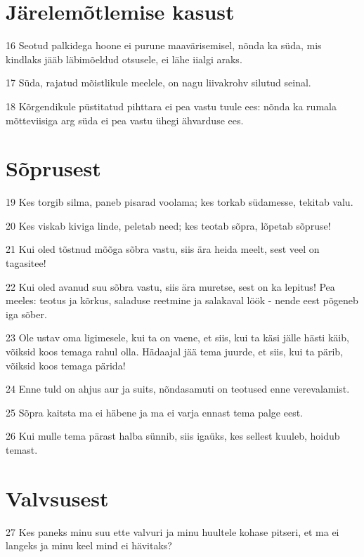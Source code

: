 \section*{Järelemõtlemise kasust}

\par 16 Seotud palkidega hoone ei purune maavärisemisel, nõnda ka süda, mis kindlaks jääb läbimõeldud otsusele, ei lähe iialgi araks.
\par 17 Süda, rajatud mõistlikule meelele, on nagu liivakrohv silutud seinal.
\par 18 Kõrgendikule püstitatud pihttara ei pea vastu tuule ees: nõnda ka rumala mõtteviisiga arg süda ei pea vastu ühegi ähvarduse ees.

\section*{Sõprusest}

\par 19 Kes torgib silma, paneb pisarad voolama; kes torkab südamesse, tekitab valu.
\par 20 Kes viskab kiviga linde, peletab need; kes teotab sõpra, lõpetab sõpruse!
\par 21 Kui oled tõstnud mõõga sõbra vastu, siis ära heida meelt, sest veel on tagasitee!
\par 22 Kui oled avanud suu sõbra vastu, siis ära muretse, sest on ka lepitus! Pea meeles: teotus ja kõrkus, saladuse reetmine ja salakaval löök - nende eest põgeneb iga sõber.
\par 23 Ole ustav oma ligimesele, kui ta on vaene, et siis, kui ta käsi jälle hästi käib, võiksid koos temaga rahul olla. Hädaajal jää tema juurde, et siis, kui ta pärib, võiksid koos temaga pärida!
\par 24 Enne tuld on ahjus aur ja suits, nõndasamuti on teotused enne verevalamist.
\par 25 Sõpra kaitsta ma ei häbene ja ma ei varja ennast tema palge eest.
\par 26 Kui mulle tema pärast halba sünnib, siis igaüks, kes sellest kuuleb, hoidub temast.

\section*{Valvsusest}

\par 27 Kes paneks minu suu ette valvuri ja minu huultele kohase pitseri, et ma ei langeks ja minu keel mind ei hävitaks?

